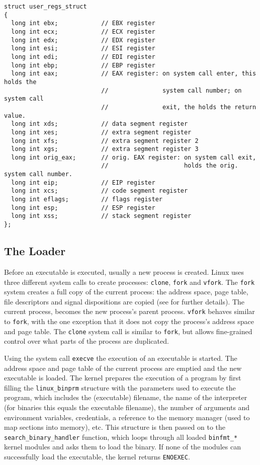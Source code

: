 \documentclass{article}
\begin{document}
\begin{lstlisting}[caption={Definition of the 32-bit version of the \texttt{struct user\_regs\_struct} for reference}, label={lst:userregs}]
struct user_regs_struct
{
  long int ebx;            // EBX register
  long int ecx;            // ECX register
  long int edx;            // EDX register
  long int esi;            // ESI register
  long int edi;            // EDI register
  long int ebp;            // EBP register
  long int eax;            // EAX register: on system call enter, this holds the
                           //               system call number; on system call
                           //               exit, the holds the return value.
  long int xds;            // data segment register
  long int xes;            // extra segment register
  long int xfs;            // extra segment register 2
  long int xgs;            // extra segment register 3
  long int orig_eax;       // orig. EAX register: on system call exit,
                           //                     holds the orig. system call number.
  long int eip;            // EIP register
  long int xcs;            // code segment register
  long int eflags;         // flags register
  long int esp;            // ESP register
  long int xss;            // stack segment register
};
\end{lstlisting}

\subsection{The Loader}
\label{loader}

Before an executable is executed, usually a new process is created. Linux uses three different system calls to create processes: \texttt{clone}, \texttt{fork} and \texttt{vfork}. The \texttt{fork} system creates a full copy of the current process: the address space, page table, file descriptors and signal dispositions are copied (see \cite{ForkManPage} for further details). The current process, becomes the new process's parent process. \texttt{vfork} behaves similar to \texttt{fork}, with the one exception that it does not copy the process's address space and page table. The \texttt{clone} system call is similar to \texttt{fork}, but allows fine-grained control over what parts of the process are duplicated.

Using the system call \texttt{execve} the execution of an executable is started. The address space and page table of the current process are emptied and the new executable is loaded. The kernel prepares the execution of a program by first filling the \texttt{linux\_binprm} structure with the parameters used to execute the program, which includes the (executable) filename, the name of the interpreter (for binaries this equals the executable filename), the number of arguments and environment variables, credentials, a reference to the memory manager (used to map sections into memory), etc. This structure is then passed on to the \texttt{search\_binary\_handler} function, which loops through all loaded \texttt{binfmt\_*} kernel modules and asks them to load the binary. If none of the modules can successfully load the executable, the kernel returns \texttt{ENOEXEC}.
\end{document}
